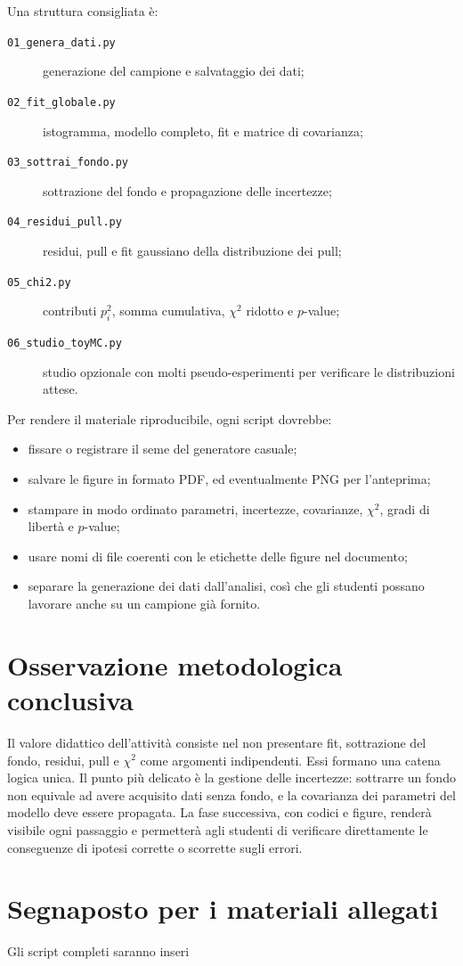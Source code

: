 \documentclass[11pt,a4paper]{book}
\begin{document}
Una struttura consigliata è:
\begin{description}
 \item[\texttt{01\_genera\_dati.py}] generazione del campione e salvataggio dei dati;
 \item[\texttt{02\_fit\_globale.py}] istogramma, modello completo, fit e matrice di covarianza;
 \item[\texttt{03\_sottrai\_fondo.py}] sottrazione del fondo e propagazione delle incertezze;
 \item[\texttt{04\_residui\_pull.py}] residui, pull e fit gaussiano della distribuzione dei pull;
 \item[\texttt{05\_chi2.py}] contributi $p_i^2$, somma cumulativa, $\chi^2$ ridotto e $p$-value;
 \item[\texttt{06\_studio\_toyMC.py}] studio opzionale con molti pseudo-esperimenti per verificare le distribuzioni attese.
\end{description}

Per rendere il materiale riproducibile, ogni script dovrebbe:
\begin{itemize}
 \item fissare o registrare il seme del generatore casuale;
 \item salvare le figure in formato PDF, ed eventualmente PNG per l'anteprima;
 \item stampare in modo ordinato parametri, incertezze, covarianze, $\chi^2$, gradi di libertà e $p$-value;
 \item usare nomi di file coerenti con le etichette delle figure nel documento;
 \item separare la generazione dei dati dall'analisi, così che gli studenti possano lavorare anche su un campione già fornito.
\end{itemize}

\section{Osservazione metodologica conclusiva}
Il valore didattico dell'attività consiste nel non presentare fit, sottrazione del fondo, residui, pull e $\chi^2$ come argomenti indipendenti. Essi formano una catena logica unica. Il punto più delicato è la gestione delle incertezze: sottrarre un fondo non equivale ad avere acquisito dati senza fondo, e la covarianza dei parametri del modello deve essere propagata. La fase successiva, con codici e figure, renderà visibile ogni passaggio e permetterà agli studenti di verificare direttamente le conseguenze di ipotesi corrette o scorrette sugli errori.

\appendix
\section{Segnaposto per i materiali allegati}
Gli script completi saranno inseri
\end{document}
